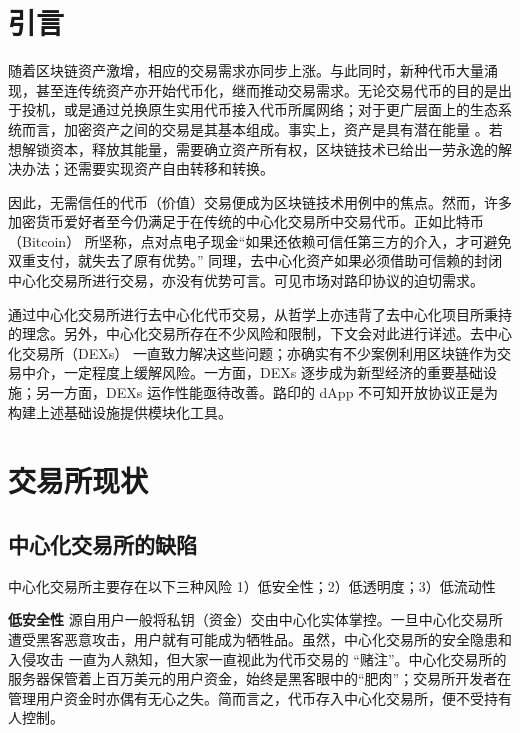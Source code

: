 \documentclass[UTF8,nofonts]{ctexart}%
\begin{document}
\begin{multicols}{2}
\section{引言\label{sec:introduction}}

随着区块链资产激增，相应的交易需求亦同步上涨。与此同时，新种代币大量涌现，甚至连传统资产亦开始代币化，继而推动交易需求。无论交易代币的目的是出于投机，或是通过兑换原生实用代币接入代币所属网络；对于更广层面上的生态系统而言，加密资产之间的交易是其基本组成。事实上，资产是具有潜在能量 \cite{desotocapital}。若想解锁资本，释放其能量，需要确立资产所有权，区块链技术已给出一劳永逸的解决办法；还需要实现资产自由转移和转换。
 
因此，无需信任的代币（价值）交易便成为区块链技术用例中的焦点。然而，许多加密货币爱好者至今仍满足于在传统的中心化交易所中交易代币。正如比特币（Bitcoin） \cite{nakamoto2008bitcoin}所坚称，点对点电子现金\enquote{如果还依赖可信任第三方的介入，才可避免双重支付，就失去了原有优势。} 同理，去中心化资产如果必须借助可信赖的封闭中心化交易所进行交易，亦没有优势可言。可见市场对路印协议的迫切需求。

通过中心化交易所进行去中心化代币交易，从哲学上亦违背了去中心化项目所秉持的理念。另外，中心化交易所存在不少风险和限制，下文会对此进行详述。去中心化交易所（DEXs） \cite{schuh2015bitshares} \cite{bancor} \cite{kyber} 一直致力解决这些问题；亦确实有不少案例利用区块链作为交易中介，一定程度上缓解风险。一方面，DEXs 逐步成为新型经济的重要基础设施；另一方面，DEXs 运作性能亟待改善。路印的 dApp 不可知开放协议正是为构建上述基础设施提供模块化工具。

\section{交易所现状\label{sec:current_exchange_landscape}}

\subsection{中心化交易所的缺陷}
中心化交易所主要存在以下三种风险 1）低安全性；2）低透明度；3）低流动性

\textbf{低安全性} 源自用户一般将私钥（资金）交由中心化实体掌控。一旦中心化交易所遭受黑客恶意攻击，用户就有可能成为牺牲品。虽然，中心化交易所的安全隐患和入侵攻击 \cite{coincheckhack}  \cite{mcmillan2014inside}一直为人熟知，但大家一直视此为代币交易的 \enquote{赌注}。中心化交易所的服务器保管着上百万美元的用户资金，始终是黑客眼中的“肥肉”；交易所开发者在管理用户资金时亦偶有无心之失。简而言之，代币存入中心化交易所，便不受持有人控制。



\end{multicols}
\end{document}
